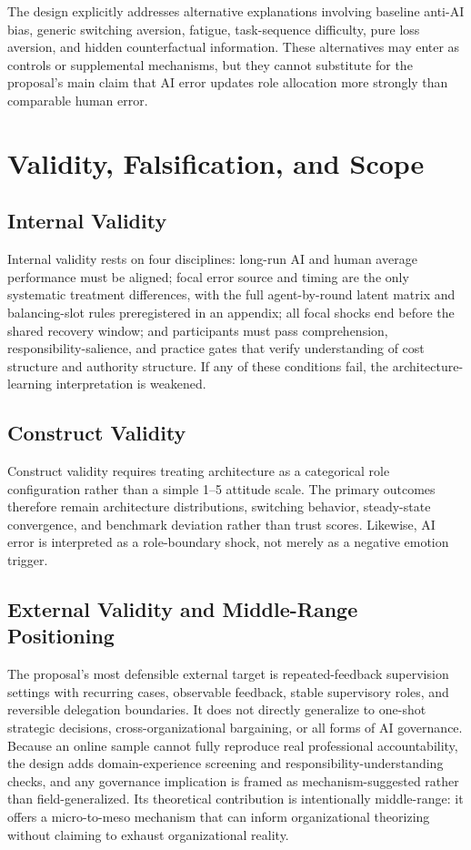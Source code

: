 \documentclass[man,natbib]{apa7}
\begin{document}
The design explicitly addresses alternative explanations involving baseline anti-AI bias, generic switching aversion, fatigue, task-sequence difficulty, pure loss aversion, and hidden counterfactual information. These alternatives may enter as controls or supplemental mechanisms, but they cannot substitute for the proposal's main claim that AI error updates role allocation more strongly than comparable human error.

\section{Validity, Falsification, and Scope}

\subsection{Internal Validity}

Internal validity rests on four disciplines: long-run AI and human average performance must be aligned; focal error source and timing are the only systematic treatment differences, with the full agent-by-round latent matrix and balancing-slot rules preregistered in an appendix; all focal shocks end before the shared recovery window; and participants must pass comprehension, responsibility-salience, and practice gates that verify understanding of cost structure and authority structure. If any of these conditions fail, the architecture-learning interpretation is weakened.

\subsection{Construct Validity}

Construct validity requires treating architecture as a categorical role configuration rather than a simple 1--5 attitude scale. The primary outcomes therefore remain architecture distributions, switching behavior, steady-state convergence, and benchmark deviation rather than trust scores. Likewise, AI error is interpreted as a role-boundary shock, not merely as a negative emotion trigger.

\subsection{External Validity and Middle-Range Positioning}

The proposal's most defensible external target is repeated-feedback supervision settings with recurring cases, observable feedback, stable supervisory roles, and reversible delegation boundaries. It does not directly generalize to one-shot strategic decisions, cross-organizational bargaining, or all forms of AI governance. Because an online sample cannot fully reproduce real professional accountability, the design adds domain-experience screening and responsibility-understanding checks, and any governance implication is framed as mechanism-suggested rather than field-generalized. Its theoretical contribution is intentionally middle-range: it offers a micro-to-meso mechanism that can inform organizational theorizing without claiming to exhaust organizational reality.
\end{document}
